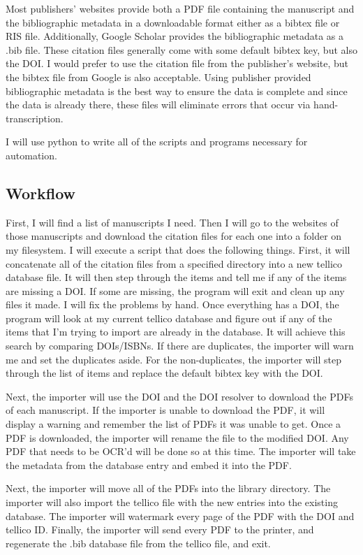 \documentclass[letterpaper,12pt]{article}
\begin{document}
Most publishers' websites provide both a PDF file containing the manuscript and the bibliographic metadata in a downloadable format either as a bibtex file or RIS file. Additionally, Google Scholar provides the bibliographic metadata as a .bib file. These citation files generally come with some default bibtex key, but also the DOI. I would prefer to use the citation file from the publisher's website, but the bibtex file from Google is also acceptable. Using publisher provided bibliographic metadata is the best way to ensure the data is complete and since the data is already there, these files will eliminate errors that occur via hand-transcription.

I will use python to write all of the scripts and programs necessary for automation.



\subsection{Workflow}
First, I will find a list of manuscripts I need. Then I will go to the websites of those manuscripts and download the citation files for each one into a folder on my filesystem. I will execute a script that does the following things. First, it will concatenate all of the citation files from a specified directory into a new tellico database file. It will then step through the items and tell me if any of  the items are missing a DOI. If some are missing, the program will exit and clean up any files it made. I will fix the problems by hand. Once everything has a DOI, the program will look at my current tellico database and figure out if any of the items that I'm trying to import are already in the database. It will achieve this search by comparing DOIs/ISBNs. If there are duplicates, the importer will warn me and set the duplicates aside. For the non-duplicates, the importer will step through the list of items and replace the default bibtex key with the DOI.

Next, the importer will use the DOI and the DOI resolver to download the PDFs of each manuscript. If the importer is unable to download the PDF, it will display a warning and remember the list of PDFs it was unable to get. Once a PDF is downloaded, the importer will rename the file to the modified DOI. Any PDF that needs to be OCR'd will be done so at this time. The importer will take the metadata from the database entry and embed it into the PDF.

Next, the importer will move all of the PDFs into the library directory. The importer will also import the tellico file with the new entries into the existing database. The importer will watermark every page of the PDF with the DOI and tellico ID. Finally, the importer will send every PDF to the printer, and regenerate the .bib database file from the tellico file, and exit.
\end{document}

